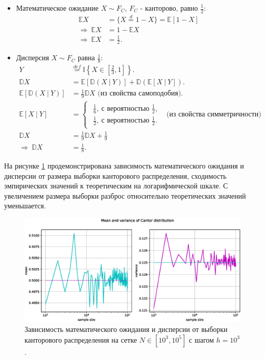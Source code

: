 \documentclass[11pt]{report}
\begin{document}
\begin{itemize}
\item Математическое ожидание $X\sim F_C$, $F_C$ - канторово, равно $\frac{1}{2}$:
$$
\begin{aligned}
\mathbb{E}X &= \{X\stackrel{d}{=}1-X \} = \mathbb{E}[1-X] \\ 
\Rightarrow~\mathbb{E}X &= 1 - \mathbb{E}X \\ 
\Rightarrow~\mathbb{E}X &= \frac{1}{2}.
\end{aligned}
$$
\item Дисперсия $X\sim F_C$ равна $\frac{1}{8}$:
$$
\begin{aligned}
Y &\stackrel{def}{=} \mathbb{I}\left\{ X\in\left[\frac{2}{3},1\right]\right\}. \\
\mathbb{D}X &= \mathbb{E}[\mathbb{D}(X~|~Y)] + \mathbb{D}(\mathbb{E}[X~|~Y]). \\
\mathbb{E}[\mathbb{D}(X~|~Y)] &= \frac{1}{9}\mathbb{D}X \text{ (из свойства самоподобия)}. \\
\mathbb{E}[X~|~Y] &= \begin{cases}\begin{array}{cc}
\frac{1}{6},~ \text{с вероятностью } \frac{1}{2}, \\
\frac{1}{2},~ \text{с вероятностью } \frac{1}{2}.
\end{array}\end{cases}\text{ (из свойства симметричности)} \\
\mathbb{D}X &= \frac{1}{9}\mathbb{D}X + \frac{1}{9} \\
\Rightarrow~ \mathbb{D}X &= \frac{1}{8}.
\end{aligned}
$$
\end{itemize}

На рисунке \ref{fig:kantor-moments} продемонстрирована зависимость математического ожидания и дисперсии от размера выборки канторового распределения, сходимость эмпирических значений к теоретическим на логарифмической шкале. С увеличением размера выборки разброс относительно теоретических значений уменьшается.

\begin{figure}[H]
    \centering
    \includegraphics[width=1\linewidth]{kantor-moments.eps}
    \caption{Зависимость математического ожидания и дисперсии от выборки канторового распределения на сетке $N\in[10^3,10^5]$ с шагом $h=10^3$.}
    \label{fig:kantor-moments}
\end{figure}
\end{document}
